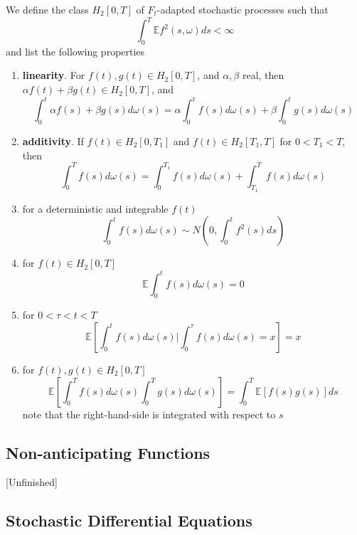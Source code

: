 \documentclass[12pt]{report}
\begin{document}
We define the class $H_2[0,T]$ of $F_t$-adapted stochastic processes such that 
\begin{equation*}
\int_0^T \mathbb{E}f^2(s,\omega)ds <\infty
\end{equation*}
and list the following properties
\begin{enumerate}
\item \textbf{linearity}. For $f(t),g(t)\in H_2[0,T]$, and $\alpha,\beta$ real, then $\alpha f(t)+\beta g(t) \in H_2[0,T]$, and 
\begin{equation*}
\int_0^t \alpha f(s)+\beta g(s) d\omega(s) = \alpha \int_0^t f(s)d\omega(s) +\beta \int_0^t g(s)d\omega(s)
\end{equation*}
\item \textbf{additivity}. If $f(t)\in H_2[0,T_1]$ and $f(t)\in H_2[T_1,T]$ for $0<T_1<T$, then 
\begin{equation*}
\int_0^Tf(s)d\omega(s) = \int_0^{T_1}f(s)d\omega(s) +\int_{T_1}^T f(s)d\omega(s)
\end{equation*}
\item for a deterministic and integrable $f(t)$
\begin{equation*}
\int_0^t f(s)d\omega(s) \sim N\left(0,\int_0^t f^2(s)ds\right)
\end{equation*}
\item for $f(t)\in H_2[0,T]$
\begin{equation*}
\mathbb{E}\int_0^t f(s)d\omega(s) = 0
\end{equation*}
\item for $0<\tau<t<T$  
\begin{equation*}
\mathbb{E}\left[\int_0^t f(s)d\omega(s)  | \int_0^\tau f(s)d\omega(s)=x \right] =x 
\end{equation*}
\item for $f(t),g(t)\in H_2[0,T]$
\begin{equation*}
\mathbb{E}\left[\int_0^Tf(s)d\omega(s)\int_0^T g(s)d\omega(s)\right]=\int_0^T\mathbb{E}[f(s)g(s)]ds
\end{equation*}
note that the right-hand-side is integrated with respect to $s$
\end{enumerate}
\subsection{Non-anticipating Functions}{[Unfinished]}

\subsection{Stochastic Differential Equations}
\end{document}
